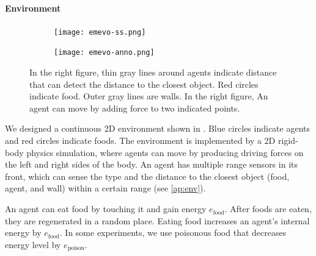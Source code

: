 \paragraph{Environment}

\begin{figure}[t]
  \begin{subfigure}[t]{6cm}
    \centering
    \texttt{[image: emevo-ss.png]}
  \end{subfigure}
  \begin{subfigure}[t]{8cm}
    \centering
    \texttt{[image: emevo-anno.png]}
  \end{subfigure}
  \caption{
    In the right figure, thin gray lines around agents indicate distance that can detect the distance to the closest object. Red circles indicate food. Outer gray lines are walls.
    In the right figure, An agent can move by adding force to two indicated points.
  }\label{figure:env}
\end{figure}

We designed a continuous 2D environment shown in . Blue circles indicate agents and red circles indicate foods. The environment is implemented by a 2D rigid-body physics simulation, where agents can move by 
producing driving forces on the left and right sides of the body.
An agent has multiple range sensors in its front, which can sense the type and the distance to the closest object (food, agent, and wall) within a certain range 
(see \cref{ap:env}).

An agent can eat food by touching it and gain energy $e_{\mathrm{food}}$. After foods are eaten, they are regenerated in a random place.
Eating food increases an agent's internal energy by $e_{\mathrm{food}}$. In some experiments, we use poisonous food that decreases energy level by $e_{\mathrm{poison}}$.

